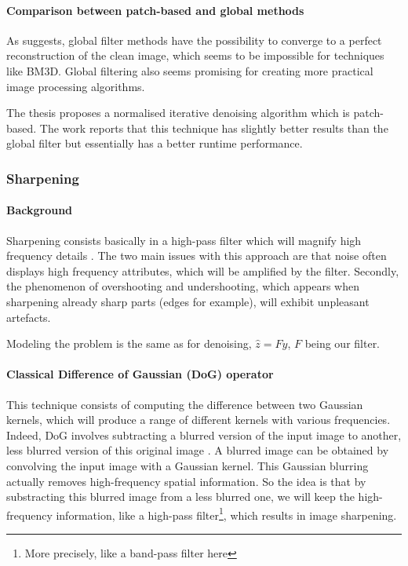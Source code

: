 \documentclass[]{article}
\begin{document}
\paragraph{Comparison between patch-based and global methods}
As \cite{talebi_asymptotic_2016} suggests, global filter methods have the possibility to converge to a perfect reconstruction of the clean image, which seems to be impossible for techniques like BM3D.
Global filtering also seems promising for creating more practical image processing algorithms.

The thesis \cite{kheradmand_graph-based_2016} proposes a normalised iterative denoising algorithm which is patch-based.
The work reports that this technique has slightly better results than the global filter but essentially has a better runtime performance.

\subsubsection{Sharpening}

\paragraph{Background}
Sharpening consists basically in a high-pass filter which will magnify high frequency details \cite{kheradmand_graph-based_2016}.
The two main issues with this approach are that noise often displays high frequency attributes, which will be amplified by the filter.
Secondly, the phenomenon of overshooting and undershooting, which appears when sharpening already sharp parts (edges for example), will exhibit unpleasant artefacts.

Modeling the problem is the same as for denoising, \(\hat{z} = Fy\), \(F\) being our filter.

\paragraph{Classical Difference of Gaussian (DoG) operator}
This technique consists of computing the difference between two Gaussian kernels, which will produce a range of different kernels with various frequencies.
Indeed, DoG involves subtracting a blurred version of the input image to another, less blurred version of this original image \cite{wiki:Difference_of_Gaussians}.
A blurred image can be obtained by convolving the input image with a Gaussian kernel.
This Gaussian blurring actually removes high-frequency spatial information.
So the idea is that by substracting this blurred image from a less blurred one, we will keep the high-frequency information, like a high-pass filter\footnote{More precisely, like a band-pass filter here}, which results in image sharpening.
\end{document}
